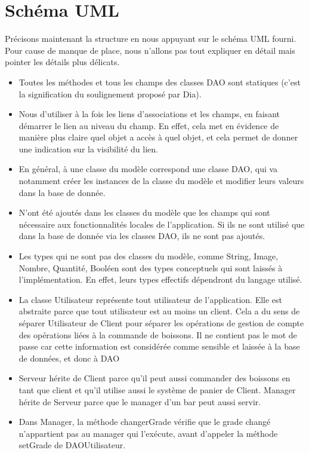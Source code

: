 \documentclass[a4paper,10pt]{article}
\begin{document}
\section{Schéma UML}

Précisons maintenant la structure en nous appuyant sur le schéma UML fourni. Pour cause de manque de place, nous n'allons pas tout expliquer en détail mais pointer les détails plus délicats.

\begin{itemize}
    \item Toutes les méthodes et tous les champs des classes DAO sont statiques (c'est la signification du soulignement proposé par Dia).
    \item Nous d'utiliser à la fois les liens d'associations et les champs, en faisant démarrer le lien au niveau du champ. En effet, cela met en évidence de manière plus claire quel objet a accès à quel objet, et cela permet de donner une indication sur la visibilité du lien.
    \item En général, à une classe du modèle correspond une classe DAO, qui va notamment créer les instances de la classe du modèle et modifier leurs valeurs dans la base de donnée.
    \item N'ont été ajoutés dans les classes du modèle que les champs qui sont nécessaire aux fonctionnalités locales de l'application. Si ils ne sont utilisé que dans la base de donnée via les classes DAO, ils ne sont pas ajoutés.
    \item Les types qui ne sont pas des classes du modèle, comme String, Image, Nombre, Quantité, Booléen sont des types conceptuels qui sont laissés à l'implémentation. En effet, leurs types effectifs dépendront du langage utilisé.
    \item La classe Utilisateur représente tout utilisateur de l'application. Elle est abstraite parce que tout utilisateur est au moins un client. Cela a du sens de séparer Utilisateur de Client pour séparer les opérations de gestion de compte des opérations liées à la commande de boissons. Il ne contient pas le mot de passe car cette information est considérée comme sensible et laissée à la base de données, et donc à DAO
    \item Serveur hérite de Client parce qu'il peut aussi commander des boissons en tant que client et qu'il utilise aussi le système de panier de Client. Manager hérite de Serveur parce que le manager d'un bar peut aussi servir.
    \item Dans Manager, la méthode changerGrade vérifie que le grade changé n'appartient pas au manager qui l'exécute, avant d'appeler la méthode setGrade de DAOUtilisateur.

\end{itemize}
\end{document}
